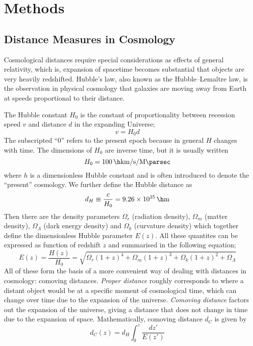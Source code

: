 \chapter{\label{method}Methods}

\setcounter{equation}{0}
\setcounter{table}{0}
\setcounter{figure}{0}

\section{Distance Measures in Cosmology}
Cosmological distances require special considerations as effects of general relativity, which is, expansion of spacetime becomes substantial that objects are very heavily redshifted. Hubble's law, also known as the Hubble–Lemaître law, is the observation in physical cosmology that galaxies are moving away from Earth at speeds proportional to their distance.
\par 
The Hubble constant $ H_0 $ is the constant of proportionality between recession speed $ v $ and distance $ d $ in the expanding Universe;
\begin{equation}
	v = H_0 d
\end{equation}
The subscripted ``0'' refers to the present epoch because in general $ H $ changes with time. The dimensions of $ H_0 $ are inverse time, but it is usually written
\begin{equation}
	H_0 = \SI{100}{\h \kilo \meter \per \second \per \mega \parsec}
\end{equation}
where $ h $ is a dimensionless Hubble constant and is often introduced to denote the ``present'' cosmology. We further define the Hubble distance as
\begin{equation}
	d_H \equiv \dfrac{c}{H_0} = \SI{9.26e25}{\per \h \metre}
\end{equation}
Then there are the density parameters $ \Omega_r $ (radiation density), $\Omega_m$ (matter density), $\Omega_{\Lambda}$ (dark energy density) and $\Omega_k$ (curvature density) which together define the dimensionless Hubble parameter $ E(z) $. All these quantites can be expressed as function of redshift $ z $ and summarised in the following equation;
\begin{equation}
	E (z) = \dfrac{H(z)}{H_0} = \sqrt{\Omega_r(1+z)^4 + \Omega_m(1+z)^3 + \Omega_k(1+z)^2 + \Omega_{\Lambda}}
\end{equation} 
All of these form the basis of a more convenient way of dealing with distances in cosmology: comoving distances. \textit{Proper distance} roughly corresponds to where a distant object would be at a specific moment of cosmological time, which can change over time due to the expansion of the universe. \textit{Comoving distance} factors out the expansion of the universe, giving a distance that does not change in time due to the expansion of space. Mathematically, comoving distance $ d_C $ is given by
\begin{equation}
	d_C(z) = d_H \int_0^z \dfrac{dz'}{E(z')}
\end{equation}
